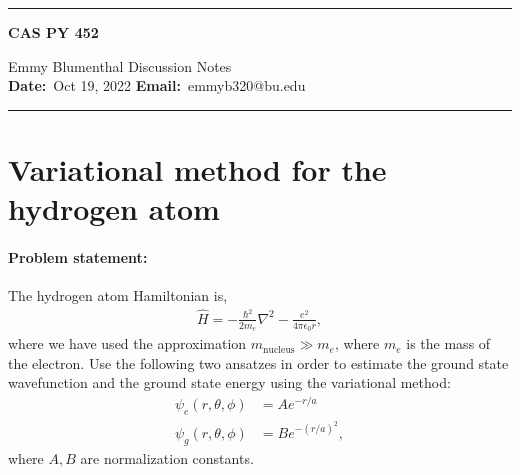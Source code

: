 \documentclass[10pt]{article}
\newcommand{\1}{\mathbf 1}
\begin{document}
\begin{center}
	\hrule
	\vspace{.4cm}
	{\textbf { \large CAS PY 452}}
\end{center}
Emmy Blumenthal \hspace{\fill} \hspace{\fill}  \textbf{} Discussion Notes\  \\
\textbf{Date:}\  Oct 19, 2022   \hspace{\fill} \textbf{Email:}\ emmyb320@bu.edu

\vspace{.4cm}
\hrule

\section*{Variational method for the hydrogen atom}

\paragraph{Problem statement:}

The hydrogen atom Hamiltonian is,
\begin{align}
	\hat H 
	=
	-
	\frac{\hbar^2}{2m_e}
	\nabla^2
	-
	\frac{e^2}{4 \pi \epsilon_0 r},
\end{align}
where we have used the approximation $m_\text{nucleus} \gg m_e$, where $m_e$ is the mass of the electron.
Use the following two ansatzes in order to estimate the ground state wavefunction and the ground state energy using the variational method:
\begin{align}
	\psi_e(r,\theta,\phi) &= A
	e^{-r/a}
	\\
	\psi_g(r,\theta,\phi)
	&=B
	e^{-(r/a)^2},
\end{align}
where $A,B$ are normalization constants.
\end{document}
